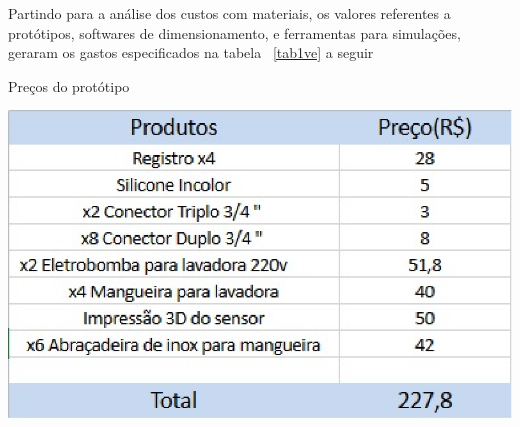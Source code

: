Partindo para a análise dos custos com materiais, os valores referentes a protótipos, softwares de dimensionamento, e ferramentas para simulações, geraram os gastos especificados na tabela ~\ref{tab1ve} a seguir 
\begin{table}[!htb]
	\centering
	\caption{Preços do protótipo}\label{tab1ve}
	\includegraphics[scale=1]{figuras/figura1ve.eps}
\end{table} 


